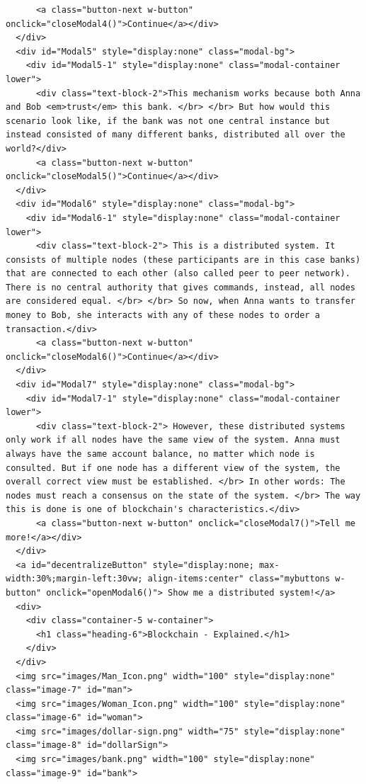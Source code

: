 \begin{lstlisting}
      <a class="button-next w-button" onclick="closeModal4()">Continue</a></div>
  </div>
  <div id="Modal5" style="display:none" class="modal-bg">
    <div id="Modal5-1" style="display:none" class="modal-container lower">
      <div class="text-block-2">This mechanism works because both Anna and Bob <em>trust</em> this bank. </br> </br> But how would this scenario look like, if the bank was not one central instance but instead consisted of many different banks, distributed all over the world?</div>
      <a class="button-next w-button" onclick="closeModal5()">Continue</a></div>
  </div>
  <div id="Modal6" style="display:none" class="modal-bg">
    <div id="Modal6-1" style="display:none" class="modal-container lower">
      <div class="text-block-2"> This is a distributed system. It consists of multiple nodes (these participants are in this case banks) that are connected to each other (also called peer to peer network). There is no central authority that gives commands, instead, all nodes are considered equal. </br> </br> So now, when Anna wants to transfer money to Bob, she interacts with any of these nodes to order a transaction.</div>
      <a class="button-next w-button" onclick="closeModal6()">Continue</a></div>
  </div>
  <div id="Modal7" style="display:none" class="modal-bg">
    <div id="Modal7-1" style="display:none" class="modal-container lower">
      <div class="text-block-2"> However, these distributed systems only work if all nodes have the same view of the system. Anna must always have the same account balance, no matter which node is consulted. But if one node has a different view of the system, the overall correct view must be established. </br> In other words: The nodes must reach a consensus on the state of the system. </br> The way this is done is one of blockchain's characteristics.</div>
      <a class="button-next w-button" onclick="closeModal7()">Tell me more!</a></div>
  </div>
  <a id="decentralizeButton" style="display:none; max-width:30%;margin-left:30vw; align-items:center" class="mybuttons w-button" onclick="openModal6()"> Show me a distributed system!</a>
  <div>
    <div class="container-5 w-container">
      <h1 class="heading-6">Blockchain - Explained.</h1>
    </div>
  </div>
  <img src="images/Man_Icon.png" width="100" style="display:none" class="image-7" id="man">
  <img src="images/Woman_Icon.png" width="100" style="display:none" class="image-6" id="woman">
  <img src="images/dollar-sign.png" width="75" style="display:none" class="image-8" id="dollarSign">
  <img src="images/bank.png" width="100" style="display:none" class="image-9" id="bank">


\end{lstlisting}
